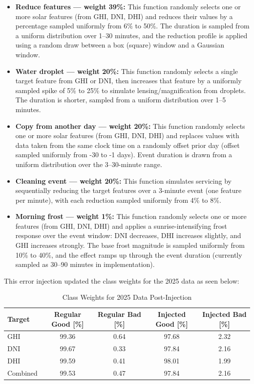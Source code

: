 \documentclass[12pt]{article}
\begin{document}
\begin{itemize}
    \item \textbf{Reduce features — weight 39\%:} This function randomly selects one or more solar features (from GHI, DNI, DHI) and reduces their values by a percentage sampled uniformly from 6\% to 50\%. The duration is sampled from a uniform distribution over 1--30 minutes, and the reduction profile is applied using a random draw between a box (square) window and a Gaussian window.
    \item \textbf{Water droplet — weight 20\%:} This function randomly selects a single target feature from GHI or DNI, then increases that feature by a uniformly sampled spike of 5\% to 25\% to simulate lensing/magnification from droplets. The duration is shorter, sampled from a uniform distribution over 1--5 minutes.
    \item \textbf{Copy from another day — weight 20\%:} This function randomly selects one or more solar features (from GHI, DNI, DHI) and replaces values with data taken from the same clock time on a randomly offset prior day (offset sampled uniformly from -30 to -1 days). Event duration is drawn from a uniform distribution over the 3--30-minute range.
    \item \textbf{Cleaning event — weight 20\%:} This function simulates servicing by sequentially reducing the target features over a 3-minute event (one feature per minute), with each reduction sampled uniformly from 4\% to 8\%.
    \item \textbf{Morning frost — weight 1\%:} This function randomly selects one or more features (from GHI, DNI, DHI) and applies a sunrise-intensifying frost response over the event window: DNI decreases, DHI increases slightly, and GHI increases strongly. The base frost magnitude is sampled uniformly from 10\% to 40\%, and the effect ramps up through the event duration (currently sampled as 30--90 minutes in implementation).
\end{itemize}

This error injection updated the class weights for the 2025 data as seen below:

\begin{table}[H]
      \centering
      \caption{Class Weights for 2025 Data Post-Injection}
      \begin{tabular}{lcccc}
            \toprule
            Target & Regular Good [\%] & Regular Bad [\%] & Injected Good [\%] & Injected Bad [\%] \\
            \midrule
            GHI & 99.36 & 0.64 & 97.68 & 2.32 \\
            DNI & 99.67 & 0.33 & 97.84 & 2.16 \\
            DHI & 99.59 & 0.41 & 98.01 & 1.99 \\
            Combined & 99.53 & 0.47 & 97.84 & 2.16 \\
            \bottomrule
      \end{tabular}
\end{table}
\end{document}
